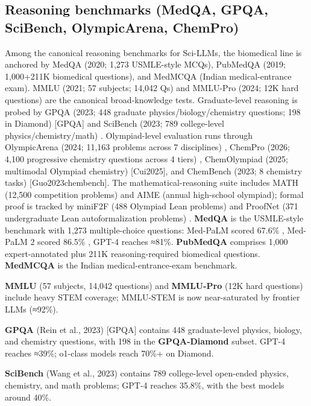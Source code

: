 \documentclass{article}
\begin{document}
\subsection{Reasoning benchmarks (MedQA, GPQA, SciBench, OlympicArena, ChemPro)}\label{reasoning-benchmarks-medqa-gpqa-scibench-olympicarena-chempro}

Among the canonical reasoning benchmarks for Sci-LLMs, the biomedical line is anchored by MedQA (2020; 1,273 USMLE-style MCQs), PubMedQA (2019; 1,000+211K biomedical questions), and MedMCQA (Indian medical-entrance exam). MMLU (2021; 57 subjects; 14,042 Qs) and MMLU-Pro (2024; 12K hard questions) are the canonical broad-knowledge tests. Graduate-level reasoning is probed by GPQA (2023; 448 graduate physics/biology/chemistry questions; 198 in Diamond) {[}GPQA{]} and SciBench (2023; 789 college-level physics/chemistry/math) \cite{wang2023scibenchevaluating}. Olympiad-level evaluation runs through OlympicArena (2024; 11,163 problems across 7 disciplines) \cite{huang2024olympicarenabenchm}, ChemPro (2026; 4,100 progressive chemistry questions across 4 tiers) \cite{baranwal2026arxiv2602031082026}, ChemOlympiad (2025; multimodal Olympiad chemistry) {[}Cui2025{]}, and ChemBench (2023; 8 chemistry tasks) {[}Guo2023chembench{]}. The mathematical-reasoning suite includes MATH (12,500 competition problems) and AIME (annual high-school olympiad); formal proof is tracked by miniF2F (488 Olympiad Lean problems) and ProofNet (371 undergraduate Lean autoformalization problems) \cite{azerbayev2023arxiv2302124332023}. \textbf{MedQA} is the USMLE-style benchmark with 1,273 multiple-choice questions: Med-PaLM scored 67.6\% \cite{singhal2023largelanguagemodel}, Med-PaLM 2 scored 86.5\% \cite{singhal2025towardexpertlevelm}, GPT-4 reaches ≈81\%. \textbf{PubMedQA} comprises 1,000 expert-annotated plus 211K reasoning-required biomedical questions. \textbf{MedMCQA} is the Indian medical-entrance-exam benchmark.

\textbf{MMLU} (57 subjects, 14,042 questions) and \textbf{MMLU-Pro} (12K hard questions) include heavy STEM coverage; MMLU-STEM is now near-saturated by frontier LLMs (≈92\%).

\textbf{GPQA} (Rein et al., 2023) {[}GPQA{]} contains 448 graduate-level physics, biology, and chemistry questions, with 198 in the \textbf{GPQA-Diamond} subset. GPT-4 reaches ≈39\%; o1-class models reach 70\%+ on Diamond.

\textbf{SciBench} (Wang et al., 2023) \cite{wang2023scibenchevaluating} contains 789 college-level open-ended physics, chemistry, and math problems; GPT-4 reaches 35.8\%, with the best models around 40\%.
\end{document}

